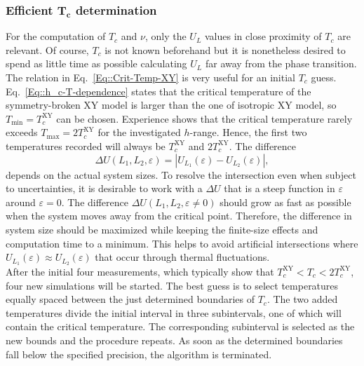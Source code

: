 	\subsubsection{Efficient $\boldsymbol{T_c}$ determination} \label{Section::efficient-crit-temp}
	For the computation of $T_c$ and $\nu$, only the $U_L$ values in close proximity of $T_c$ are relevant. Of course, $T_c$ is not known beforehand but it is nonetheless desired to spend as little time as possible calculating $U_L$ far away from the phase transition. The relation in Eq.~\eqref{Eq::Crit-Temp-XY} is very useful for an initial $T_c$ guess. Eq.~\eqref{Eq::h_c-T-dependence} states that the critical temperature of the symmetry-broken XY model is larger than the one of isotropic XY model, so $T_{\text{min}} = T_c^{\text{XY}}$ can be chosen. Experience shows that the critical temperature rarely exceeds $T_{\text{max}} = 2 T_c^{\text{XY}}$ for the investigated $h$-range. Hence, the first two temperatures recorded will always be $T_c^{\text{XY}}$ and $2T_c^{\text{XY}}$. The difference
	\begin{equation}
		\Delta U (L_1, L_2, \varepsilon) =	|U_{L_1}(\varepsilon) - U_{L_2}(\varepsilon)|,
	\end{equation}
	depends on the actual system sizes. To resolve the intersection even when subject to uncertainties, it is desirable to work with a $\Delta U$ that is a steep function in $\varepsilon$ around $\varepsilon =	0$. The difference $\Delta U(L_1, L_2, \varepsilon \neq 0)$ should grow as fast as possible when the system moves away from the critical point. Therefore, the difference in system size should be maximized while keeping the finite-size effects and computation time to a minimum. This helps to avoid artificial intersections where $U_{L_1}(\varepsilon) \approx U_{L_2}(\varepsilon)$ that occur through thermal fluctuations. \\
	
	After the initial four measurements, which typically show that $T_c^{\text{XY}}  < T_c < 2 T_c^{\text{XY}}$, four new simulations will be started. The best guess is to select temperatures equally spaced between the just determined boundaries of $T_c$. The two added temperatures divide the initial interval in three subintervals, one of which will contain the critical temperature. The corresponding subinterval is selected as the new bounds and the procedure repeats. As soon as the determined boundaries fall below the specified precision, the algorithm is terminated.\\
	
